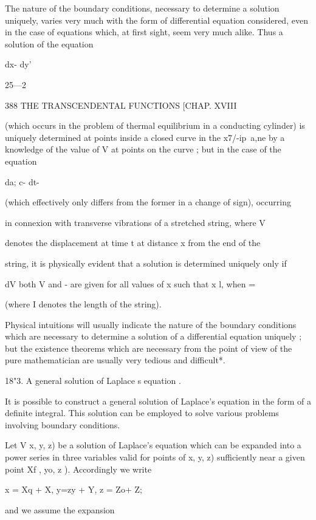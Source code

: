 The nature of the boundary conditions, necessary to determine a
solution uniquely, varies very much with the form of differential
equation considered, even in the case of equations which, at first
sight, seem very much alike. Thus a solution of the equation



dx- dy'



25—2



388 THE TRANSCENDENTAL FUNCTIONS [CHAP. XVIII

(which occurs in the problem of thermal equilibrium in a conducting
cylinder) is uniquely determined at points inside a closed curve in
the x7/-ip\ a,ne by a knowledge of the value of V at points on the
curve ; but in the case of the equation

da; c- dt-

(which effectively only differs from the former in a change of sign),
occurring

in connexion with transverse vibrations of a stretched string, where V

denotes the displacement at time t at distance x from the end of the

string, it is physically evident that a solution is determined
uniquely only if

dV both V and - are given for all values of x such that x l, when =

(where I denotes the length of the string).

Physical intuitions will usually indicate the nature of the boundary
conditions which are necessary to determine a solution of a
differential equation uniquely ; but the existence theorems which are
necessary from the point of view of the pure mathematician are usually
very tedious and difficult*.

18"3. A general solution of Laplace s equation .

It is possible to construct a general solution of Laplace's equation
in the form of a definite integral. This solution can be employed to
solve various problems involving boundary conditions.

Let V x, y, z) be a solution of Laplace's equation which can be
expanded into a power series in three variables valid for points of x,
y, z) sufficiently near a given point Xf , yo, z ). Accordingly we
write

x = Xq + X, y=zy + Y, z = Zo+ Z;

and we assume the expansion

